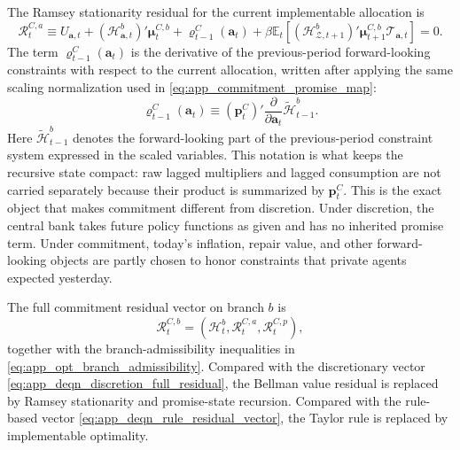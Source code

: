 ﻿\documentclass[12pt]{article}
\theoremstyle{remark}
\newcommand{\E}{\mathbb E}
\begin{document}
The Ramsey stationarity residual for the current implementable allocation is
\begin{equation}
    \mathcal R_t^{C,a}
    \equiv
    U_{\mathbf a,t}
    +
    \left(\mathcal H_{\mathbf a,t}^{b}\right)'
    \boldsymbol\mu_t^{C,b}
    +
    \boldsymbol\varrho_{t-1}^{C}(\mathbf a_t)
    +
    \beta
    \E_t
    \left[
        \left(\mathcal H_{\mathcal Z,t+1}^{b}\right)'
        \boldsymbol\mu_{t+1}^{C,b}
        \mathcal T_{\mathbf a,t}
    \right]
    =
    0.
    \label{eq:app_deqn_commitment_stationarity}
\end{equation}
The term $\boldsymbol\varrho_{t-1}^{C}(\mathbf a_t)$ is the derivative of the previous-period
forward-looking constraints with respect to the current allocation, written after applying the same
scaling normalization used in \eqref{eq:app_commitment_promise_map}:
\begin{equation}
    \boldsymbol\varrho_{t-1}^{C}(\mathbf a_t)
    \equiv
    \left(
        \mathbf p_t^C
    \right)'
    \frac{\partial}{\partial\mathbf a_t}
    \widetilde{\mathcal H}_{t-1}^{b}.
    \label{eq:app_commitment_lagged_promise_term}
\end{equation}
Here $\widetilde{\mathcal H}_{t-1}^{b}$ denotes the forward-looking part of the previous-period
constraint system expressed in the scaled variables. This notation is what keeps the recursive
state compact: raw lagged multipliers and lagged consumption are not carried separately because
their product is summarized by $\mathbf p_t^C$.
This is the exact object that makes commitment different from discretion. Under discretion, the
central bank takes future policy functions as given and has no inherited promise term. Under
commitment, today's inflation, repair value, and other forward-looking objects are partly chosen to
honor constraints that private agents expected yesterday.

The full commitment residual vector on branch $b$ is
\begin{equation}
    \mathcal R_t^{C,b}
    =
    \left(
        \mathcal H_t^b,
        \mathcal R_t^{C,a},
        \mathcal R_t^{C,p}
    \right),
    \label{eq:app_deqn_commitment_full_residual}
\end{equation}
together with the branch-admissibility inequalities in \eqref{eq:app_opt_branch_admissibility}.
Compared with the discretionary vector \eqref{eq:app_deqn_discretion_full_residual}, the Bellman
value residual is replaced by Ramsey stationarity and promise-state recursion. Compared with the
rule-based vector \eqref{eq:app_deqn_rule_residual_vector}, the Taylor rule is replaced by
implementable optimality.
\end{document}
